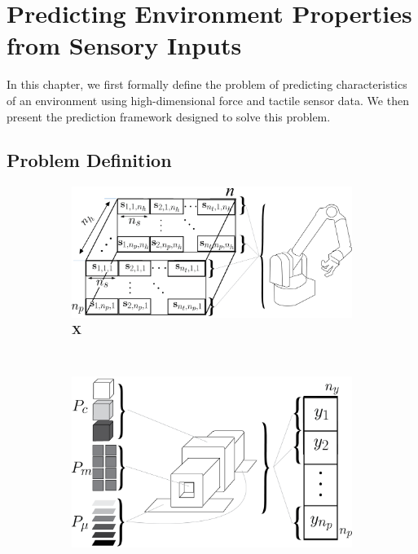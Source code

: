 \chapter{Predicting Environment Properties from Sensory Inputs}
\label{chap3}

In this chapter, we first formally define the problem of predicting characteristics of an environment using high-dimensional force and tactile sensor data. 
We then present the prediction framework designed to solve this problem.

\section{Problem Definition}

\begin{figure}[h]
  \begin{subfigure}[t]{0.52\linewidth}
    \includegraphics[width=\linewidth]{images/X_defn}  %
    \caption{$\mathbf{X}$}
    \label{fig:X_defn}
  \end{subfigure}
  ~~
  \begin{subfigure}[t]{0.43\linewidth}
    \includegraphics[width=\linewidth]{images/Y_defn}  %

\end{subfigure}
\end{figure}

